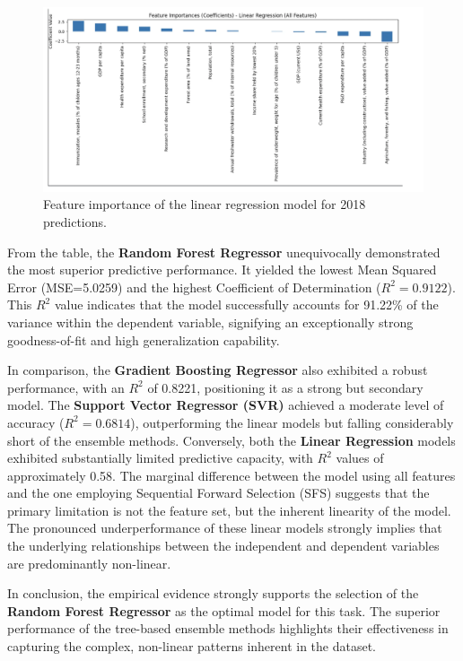\documentclass{article}
\begin{document}
\begin{figure}[h]
    \centering
    \includegraphics[width=0.8\columnwidth]{./pic/T1.b.1.png} %
    \caption{Feature importance of the linear regression model for 2018 predictions.}
    \label{fig:featureimportance}
\end{figure}

From the table, the \textbf{Random Forest Regressor} unequivocally demonstrated the most superior predictive 
performance. It yielded the lowest Mean Squared
 Error (MSE=5.0259) and the highest Coefficient of Determination ($R ^2 =0.9122$). 
 This $R^2$ value indicates that the model successfully accounts for 91.22\% of the variance within the 
 dependent variable, signifying an exceptionally strong goodness-of-fit and high generalization capability.

In comparison, the \textbf{Gradient Boosting Regressor} also exhibited a robust performance, with an $R^2$
  of 0.8221, positioning it as a strong but secondary model. The \textbf{Support Vector Regressor (SVR)} 
  achieved a moderate level of accuracy ($R^2=0.6814$), outperforming the linear models but falling 
  considerably short of the ensemble methods.
Conversely, both the \textbf{Linear Regression} models exhibited substantially limited predictive capacity, 
with $R^2$ values of approximately 0.58. The marginal difference between the model using all features 
and the one employing Sequential Forward Selection (SFS) suggests that the primary limitation is not the 
feature set, but the inherent linearity of the model. The pronounced underperformance of these linear models 
strongly implies that the underlying relationships between the independent and dependent variables are 
predominantly non-linear.

In conclusion, the empirical evidence strongly supports the selection of the 
\textbf{Random Forest Regressor} as the optimal model for this task. The superior performance of 
the tree-based ensemble methods highlights their effectiveness in capturing the complex, non-linear 
patterns inherent in the dataset.
\end{document}
